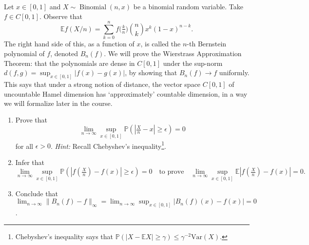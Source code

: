\documentclass[12pt,letterpaper,cm]{hmcpset}
\begin{document}
\begin{solution}
    \vfill
\end{solution}
\clearpage


\begin{problem}[EC]
    Let $x\in[0,1]$ and $X\sim\operatorname{Binomial}(n,x)$ be a binomial
    random variable. Take $f\in C[0,1]$. Observe that
    \[
        \mathbb{E} f(X/n) = \sum_{k=0}^n f\bigl(\tfrac{k}{n}\bigr) {n\choose k} x^k (1-x)^{n-k}.
    \]
    The right hand side of this, as a function of $x$, is called the $n$-th Bernstein
    polynomial of $f$, denoted $B_n(f)$. We will prove the Wierstrass Approximation Theorem:
    that the polynomials are dense in $C[0,1]$ under the sup-norm $d(f,g) = \sup_{x\in[0,1]}
    |f(x)-g(x)|$, by showing that $B_n(f) \to f$ uniformly.
    This says that under a strong notion of distance, the vector space $C[0,1]$
    of uncountable Hamel dimension has `approximately' countable dimension, in a way we will
    formalize later in the course.
    \begin{enumerate}[(1)]
        \item Prove that
            \[
                \lim_{n\to\infty}\sup_{x\in[0,1]}\mathbb{P}(|\tfrac{X}{n} - x|\geq \epsilon) = 0
            \]
            for all $\epsilon > 0$. \textit{Hint:} Recall Chebyshev's
            inequality\footnote{Chebyshev's inequality says that
            $\mathbb{P}(|X - \mathbb{E}X| \geq \gamma)\leq \gamma^{-2}\text{Var}(X)$.}.
        \item Infer that
            \[
                \lim_{n\to\infty}\sup_{x\in[0,1]} \mathbb{P}(|f(\tfrac{X}{n}) - f(x)|\geq \epsilon) = 0\quad\text{to prove}\quad
                \lim_{n\to\infty}\sup_{x\in[0,1]}\mathbb{E}|f(\tfrac{X}{n}) - f(x)| = 0.
            \]
        \item Conclude that $\lim_{n\to\infty}\|B_n(f) - f\|_\infty =
            \lim_{n\to\infty}\sup_{x\in[0,1]}|B_n(f)(x) - f(x)| = 0$.
    \end{enumerate}
\end{problem}

\begin{solution}
    \vfill
\end{solution}
\clearpage
\end{document}
